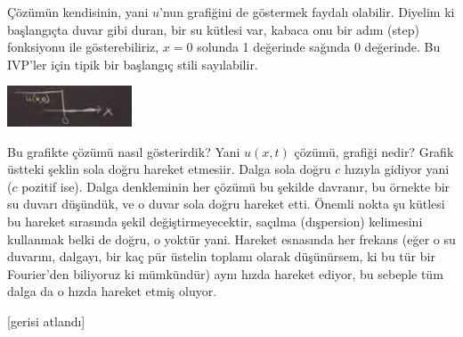 \documentclass[12pt,fleqn]{article}\usepackage{../../common}
\begin{document}
Çözümün kendisinin, yani $u$'nun grafiğini de göstermek faydalı olabilir.
Diyelim ki başlangıçta duvar gibi duran, bir su kütlesi var, kabaca onu
bir adım (step) fonksiyonu ile gösterebiliriz, $x=0$ solunda 1 değerinde
sağında 0 değerinde. Bu IVP'ler için tipik bir başlangıç stili sayılabilir.

\includegraphics[width=10em]{compscieng_2_03_02.png}

Bu grafikte çözümü nasıl gösterirdik? Yani $u(x,t)$ çözümü, grafiği nedir?
Grafik üstteki şeklin sola doğru hareket etmesiir. Dalga sola doğru $c$ hızıyla
gidiyor yani ($c$ pozitif ise). Dalga denkleminin her çözümü bu şekilde
davranır, bu örnekte bir su duvarı düşündük, ve o duvar sola doğru hareket etti.
Önemli nokta şu kütlesi bu hareket sırasında şekil değiştirmeyecektir, saçılma
(dışpersion) kelimesini kullanmak belki de doğru, o yoktür yani. Hareket
esnasında her frekans (eğer o su duvarını, dalgayı, bir kaç pür üstelin toplamı
olarak düşünürsem, ki bu tür bir Fourier'den biliyoruz ki mümkündür) aynı
hızda hareket ediyor, bu sebeple tüm dalga da o hızda hareket etmiş oluyor. 

[gerisi atlandı]
\end{document}

